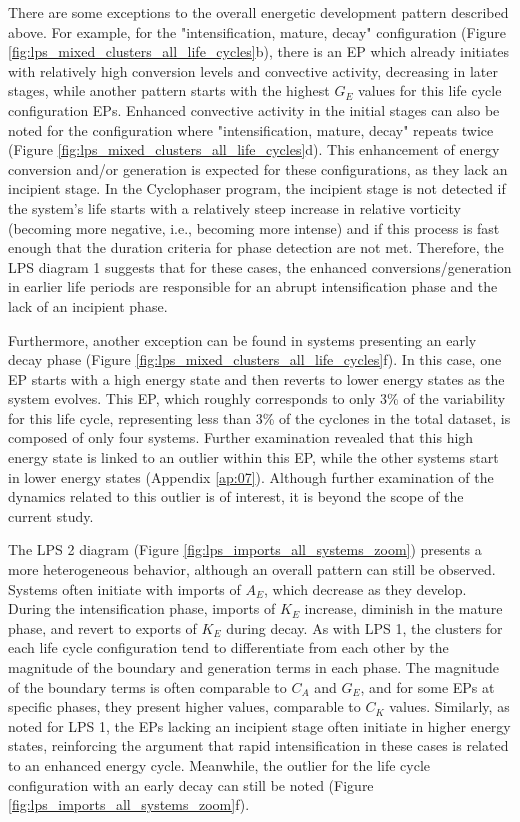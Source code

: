 There are some exceptions to the overall energetic development pattern described above. For example, for the "intensification, mature, decay" configuration (Figure \ref{fig:lps_mixed_clusters_all_life_cycles}b), there is an EP which already initiates with relatively high conversion levels and convective activity, decreasing in later stages, while another pattern starts with the highest $G_E$ values for this life cycle configuration EPs. Enhanced convective activity in the initial stages can also be noted for the configuration where "intensification, mature, decay" repeats twice (Figure \ref{fig:lps_mixed_clusters_all_life_cycles}d). This enhancement of energy conversion and/or generation is expected for these configurations, as they lack an incipient stage. In the Cyclophaser program, the incipient stage is not detected if the system's life starts with a relatively steep increase in relative vorticity (becoming more negative, i.e., becoming more intense) and if this process is fast enough that the duration criteria for phase detection are not met. Therefore, the LPS diagram 1 suggests that for these cases, the enhanced conversions/generation in earlier life periods are responsible for an abrupt intensification phase and the lack of an incipient phase.

Furthermore, another exception can be found in systems presenting an early decay phase (Figure \ref{fig:lps_mixed_clusters_all_life_cycles}f). In this case, one EP starts with a high energy state and then reverts to lower energy states as the system evolves. This EP, which roughly corresponds to only 3\% of the variability for this life cycle, representing less than 3\% of the cyclones in the total dataset, is composed of only four systems. Further examination revealed that this high energy state is linked to an outlier within this EP, while the other systems start in lower energy states (Appendix \ref{ap:07}). Although further examination of the dynamics related to this outlier is of interest, it is beyond the scope of the current study.


The LPS 2 diagram (Figure \ref{fig:lps_imports_all_systems_zoom}) presents a more heterogeneous behavior, although an overall pattern can still be observed. Systems often initiate with imports of $A_E$, which decrease as they develop. During the intensification phase, imports of $K_E$ increase, diminish in the mature phase, and revert to exports of $K_E$ during decay. As with LPS 1, the clusters for each life cycle configuration tend to differentiate from each other by the magnitude of the boundary and generation terms in each phase. The magnitude of the boundary terms is often comparable to $C_A$ and $G_E$, and for some EPs at specific phases, they present higher values, comparable to $C_K$ values. Similarly, as noted for LPS 1, the EPs lacking an incipient stage often initiate in higher energy states, reinforcing the argument that rapid intensification in these cases is related to an enhanced energy cycle. Meanwhile, the outlier for the life cycle configuration with an early decay can still be noted (Figure \ref{fig:lps_imports_all_systems_zoom}f).

